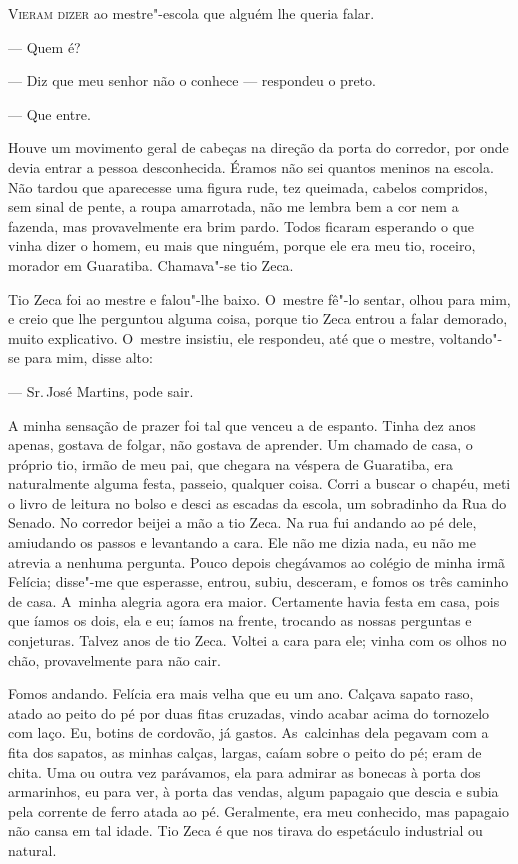 \begin{linenumbers}

\textsc{Vieram dizer} ao mestre"-escola que alguém lhe queria falar.

--- Quem é?

--- Diz que meu senhor não o conhece --- respondeu o preto.

--- Que entre.

Houve um movimento geral de cabeças na direção da porta do corredor, por
onde devia entrar a pessoa desconhecida. Éramos não sei quantos meninos
na escola. Não tardou que aparecesse uma figura rude, tez queimada,
cabelos compridos, sem sinal de pente, a roupa amarrotada, não me lembra
bem a cor nem a fazenda, mas provavelmente era brim pardo. Todos ficaram
esperando o que vinha dizer o homem, eu mais que ninguém, porque ele era
meu tio, roceiro, morador em Guaratiba. Chamava"-se tio Zeca.

Tio Zeca foi ao mestre e falou"-lhe baixo. O~mestre fê"-lo sentar, olhou
para mim, e creio que lhe perguntou alguma coisa, porque tio Zeca entrou
a falar demorado, muito explicativo. O~mestre insistiu, ele respondeu,
até que o mestre, voltando"-se para mim, disse alto:

--- Sr.\,José Martins, pode sair.

A minha sensação de prazer foi tal que venceu a de espanto. Tinha dez
anos apenas, gostava de folgar, não gostava de aprender. Um chamado de
casa, o próprio tio, irmão de meu pai, que chegara na véspera de
Guaratiba, era naturalmente alguma festa, passeio, qualquer coisa. Corri
a buscar o chapéu, meti o livro de leitura no bolso e desci as escadas
da escola, um sobradinho da Rua do Senado. No corredor beijei a mão a
tio Zeca. Na rua fui andando ao pé dele, amiudando os passos e
levantando a cara. Ele não me dizia nada, eu não me atrevia a nenhuma
pergunta. Pouco depois chegávamos ao colégio de minha irmã Felícia;
disse"-me que esperasse, entrou, subiu, desceram, e fomos os três caminho
de casa. A~minha alegria agora era maior. Certamente havia festa em
casa, pois que íamos os dois, ela e eu; íamos na frente, trocando as
nossas perguntas e conjeturas. Talvez anos de tio Zeca. Voltei a cara
para ele; vinha com os olhos no chão, provavelmente para não cair.

Fomos andando. Felícia era mais velha que eu um ano. Calçava sapato
raso, atado ao peito do pé por duas fitas cruzadas, vindo acabar acima
do tornozelo com laço. Eu, botins de cordovão, já gastos. As~calcinhas
dela pegavam com a fita dos sapatos, as minhas calças, largas, caíam
sobre o peito do pé; eram de chita. Uma ou outra vez parávamos, ela para
admirar as bonecas à porta dos armarinhos, eu para ver, à porta das
vendas, algum papagaio que descia e subia pela corrente de ferro atada
ao pé. Geralmente, era meu conhecido, mas papagaio não cansa em tal
idade. Tio Zeca é que nos tirava do espetáculo industrial ou natural.


\end{linenumbers}
